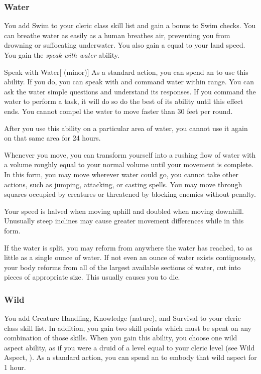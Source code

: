         \subsubsection{Water}
             You add Swim to your cleric class skill list and gain a  bonus to Swim checks.
             You can breathe water as easily as a human breathes air, preventing you from drowning or suffocating underwater.
            You also gain a  equal to your land speed.
             You gain the \textit{speak with water} ability.
            \begin{ability}{Speak with Water}[ (minor)]
                As a standard action, you can spend an  to use this ability.
                If you do, you can speak with and command water within range.
                You can ask the water simple questions and understand its responses.
                If you command the water to perform a task, it will do so do the best of its ability until this effect ends.
                You cannot compel the water to move faster than 30 feet per round.

                After you use this ability on a particular area of water, you cannot use it again on that same area for 24 hours.
            \end{ability}
            Whenever you move, you can transform yourself into a rushing flow of water with a volume roughly equal to your normal volume until your movement is complete.
            In this form, you may move wherever water could go, you cannot take other actions, such as jumping, attacking, or casting spells.
            You may move through squares occupied by creatures or threatened by blocking enemies without penalty.
            \par Your speed is halved when moving uphill and doubled when moving downhill.
            Unusually steep inclines may cause greater movement differences while in this form.
            \par If the water is split, you may reform from anywhere the water has reached, to as little as a single ounce of water.
            If not even an ounce of water exists contiguously, your body reforms from all of the largest available sections of water, cut into pieces of appropriate size.
            This usually causes you to die.

        \subsubsection{Wild}
             You add Creature Handling, Knowledge (nature), and Survival to your cleric class skill list.
            In addition, you gain two skill points which must be spent on any combination of those skills.
             When you gain this ability, you choose one wild aspect ability, as if you were a druid of a level equal to your cleric level (see Wild Aspect, ).
            As a standard action, you can spend an  to embody that wild aspect for 1 hour.


